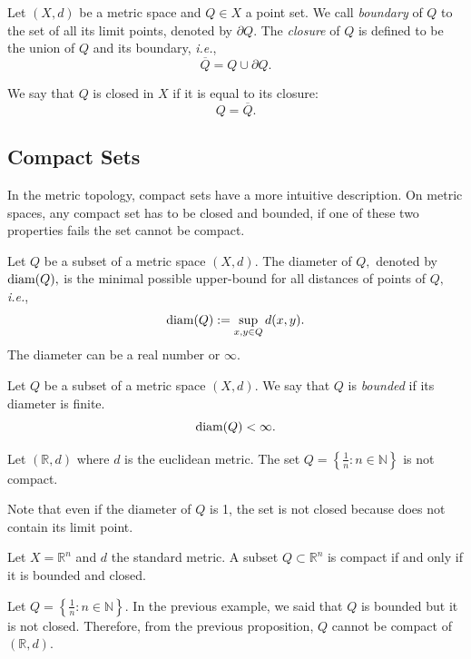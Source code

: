 \documentclass[
	fontsize=10pt, %
	twoside=false, %
	secnumdepth=1, %
]{kaobook}
\begin{document}
\begin{definition}
Let $(X,d)$ be a metric space and $Q\in X$ a point set. We call \emph{boundary} of $Q$ to the set of all its limit points, denoted by $\partial Q.$ The \emph{closure} of $Q$ is defined to be the union of $Q$ and its boundary, \emph{i.e.}, $$\overline{Q}=Q\cup \partial Q.$$ 

We say that $Q$ is closed in $X$ if it is equal to its closure: $$Q=\overline{Q}.$$
\end{definition}


\subsection{Compact Sets}

In the metric topology, compact sets have a more intuitive description. On metric spaces,  any compact set has to be closed and bounded, if one of these two properties fails the set cannot be compact. 

\begin{definition}
Let $Q$ be a subset of a metric space $(X,d).$ The diameter of $Q,$ denoted by $\mbox{\upshape{diam}}(Q),$ is the minimal possible upper-bound for all distances of points of $Q,$ \emph{i.e.}, $$\mbox{\upshape{diam}}(Q):=\sup_{x,y\in Q} d(x,y).$$ The diameter can be a real number or $\infty.$
\end{definition}


\begin{definition}
Let $Q$ be a subset of a metric space $(X,d).$ We say that $Q$ is \emph{bounded} if its diameter is finite. $$\mbox{\upshape{diam}}(Q)<\infty.$$
\end{definition}

\begin{example}
Let $(\mathbb{R},d)$ where $d$ is the euclidean metric. The set $Q=\left\{\frac{1}{n}: n\in\mathbb{N}\right\}$ is not compact. 

Note that even if the diameter of $Q$ is 1, the set is not closed because does not contain its limit point. 
\end{example}

\begin{proposition}
\label{C1:P1:CompactClosedBounded}
Let $X=\mathbb{R}^n$ and $d$ the standard metric. A subset $Q\subset \mathbb{R}^n$ is compact if and only if it is bounded and closed.
\end{proposition}

\begin{example}
Let $Q=\left\{\frac{1}{n}: n\in\mathbb{N}\right\}.$ In the previous example, we said that $Q$ is bounded but it is not closed. Therefore, from the previous proposition, $Q$ cannot be compact of $(\mathbb{R},d).$
\end{example}
\end{document}
